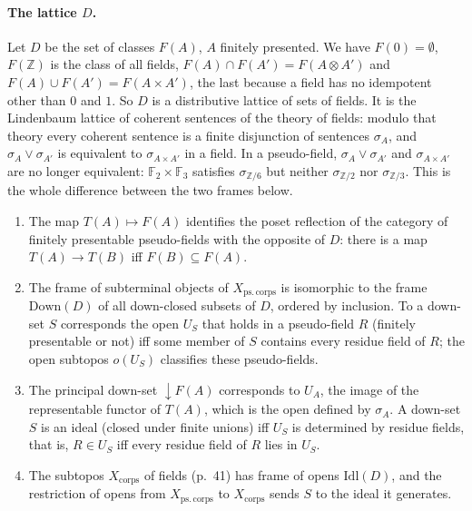 \paragraph{The lattice $D$.} Let $D$ be the set of classes $F(A)$, $A$ finitely presented. We have $F(0) = \emptyset$, $F(\mathbb Z)$ is the class of all fields, $F(A)\cap F(A') = F(A\otimes A')$ and $F(A)\cup F(A') = F(A\times A')$, the last because a field has no idempotent other than $0$ and $1$. So $D$ is a distributive lattice of sets of fields. It is the Lindenbaum lattice of coherent sentences of the theory of fields: modulo that theory every coherent sentence is a finite disjunction of sentences $\sigma_A$, and $\sigma_A\vee\sigma_{A'}$ is equivalent to $\sigma_{A\times A'}$ in a field. In a pseudo-field, $\sigma_A\vee\sigma_{A'}$ and $\sigma_{A\times A'}$ are no longer equivalent: $\mathbb F_2\times\mathbb F_3$ satisfies $\sigma_{\mathbb Z/6}$ but neither $\sigma_{\mathbb Z/2}$ nor $\sigma_{\mathbb Z/3}$. This is the whole difference between the two frames below.

\begin{theorem}\label{th:pf-frame}
\begin{enumerate}
\item The map $T(A)\mapsto F(A)$ identifies the poset reflection of the category of finitely presentable pseudo-fields with the opposite of $D$: there is a map $T(A)\to T(B)$ iff $F(B)\subseteq F(A)$.
\item The frame of subterminal objects of $X_{\mathrm{ps.\,corps}}$ is isomorphic to the frame $\mathrm{Down}(D)$ of all down-closed subsets of $D$, ordered by inclusion. To a down-set $S$ corresponds the open $U_S$ that holds in a pseudo-field $R$ (finitely presentable or not) iff some member of $S$ contains every residue field of $R$; the open subtopos $o(U_S)$ classifies these pseudo-fields.
\item The principal down-set ${\downarrow}F(A)$ corresponds to $U_A$, the image of the representable functor of $T(A)$, which is the open defined by $\sigma_A$. A down-set $S$ is an ideal (closed under finite unions) iff $U_S$ is determined by residue fields, that is, $R\in U_S$ iff every residue field of $R$ lies in $U_S$.
\item The subtopos $X_{\mathrm{corps}}$ of fields (p.~41) has frame of opens $\mathrm{Idl}(D)$, and the restriction of opens from $X_{\mathrm{ps.\,corps}}$ to $X_{\mathrm{corps}}$ sends $S$ to the ideal it generates.
\end{enumerate}
\end{theorem}

